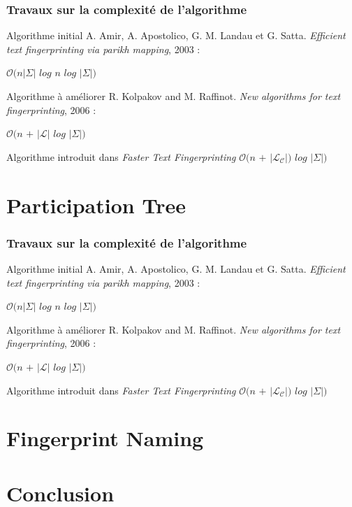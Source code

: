 \documentclass[10pt]{beamer}
\begin{document}
\begin{frame}
	\frametitle{Travaux sur la complexité de l'algorithme}
	
	\begin{block}{Algorithme initial}
		A. Amir, A. Apostolico, G. M. Landau et G. Satta. \textit{Efficient text fingerprinting via parikh mapping}, 2003 :\newline
		
		$\mathcal{O}(n|\Sigma|$ $log$ $n$ $log$ $|\Sigma|)$
	\end{block}
	
	\begin{block}{Algorithme à améliorer}
		R. Kolpakov and M. Raffinot. \textit{New algorithms for text fingerprinting}, 2006 : \newline
		
		$\mathcal{O}(n$ $+$ $|\mathcal{L}|$ $log$ $|\Sigma|)$
	\end{block}
	
	\begin{block}{Algorithme introduit dans \textit{Faster Text Fingerprinting}}
		$\mathcal{O}(n$ $+$ $|\mathcal{L}_{\mathcal{C}}|)$ $log$ $|\Sigma|)$
	\end{block}

\end{frame}


\section{Participation Tree}


\begin{frame}
	\frametitle{Travaux sur la complexité de l'algorithme}
	
	\begin{block}{Algorithme initial}
		A. Amir, A. Apostolico, G. M. Landau et G. Satta. \textit{Efficient text fingerprinting via parikh mapping}, 2003 :\newline
		
		$\mathcal{O}(n|\Sigma|$ $log$ $n$ $log$ $|\Sigma|)$
	\end{block}
	
	\begin{block}{Algorithme à améliorer}
		R. Kolpakov and M. Raffinot. \textit{New algorithms for text fingerprinting}, 2006 : \newline
		
		$\mathcal{O}(n$ $+$ $|\mathcal{L}|$ $log$ $|\Sigma|)$
	\end{block}
	
	\begin{block}{Algorithme introduit dans \textit{Faster Text Fingerprinting}}
		$\mathcal{O}(n$ $+$ $|\mathcal{L}_{\mathcal{C}}|)$ $log$ $|\Sigma|)$
	\end{block}

\end{frame}
\section{Fingerprint Naming}

\section{Conclusion}
\end{document}
